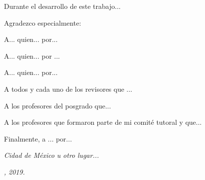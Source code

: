 

Durante el desarrollo de este trabajo...

Agradezco especialmente:

A... quien... por...

A... quien... por ...

A... quien... por...


A todos y cada uno de los revisores que ...

A los profesores del posgrado que...

A los profesores que formaron parte de mi comité tutoral y que...

Finalmente, a ... por...

\begin{flushright}
\textit{Cidad de México u otro lugar...}

\textit{ , 2019.}
\end{flushright}
 



